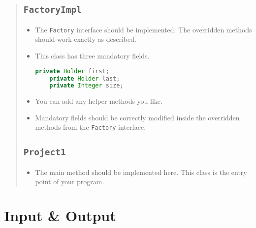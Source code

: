 \documentclass[12pt]{article}
\begin{document}
\begin{quote}
    
\subsection{\Large\textbf{\texttt{FactoryImpl}}}
    \begin{itemize}
    
    \item The \texttt{Factory} interface should be implemented. The overridden methods should work exactly as described. 
    
    \item This class has three mandatory fields. 
    
\begin{lstlisting}[language=Java]
    private Holder first;
    private Holder last;
    private Integer size;
\end{lstlisting}
        

    \item You can add any helper methods you like.
    
    \item Mandatory fields should be correctly modified inside the overridden methods from the \texttt{Factory} interface.
    
    \end{itemize}

\subsection{\Large\textbf{\texttt{Project1}}}
    \begin{itemize}

    \item The main method should be implemented here. This class is the entry point of your program. 

    \end{itemize}
    
\end{quote}

\section{Input \& Output}
\end{document}

